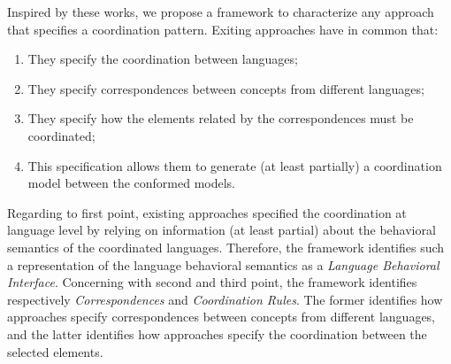 Inspired by these works, we propose a framework to characterize any approach that specifies a coordination pattern. Exiting approaches have in common that:
\begin{enumerate}
	\item They specify the coordination between languages;
	
	\item They specify correspondences between concepts from different languages;
	
	\item They specify how the elements related by the correspondences must be coordinated;
	
	\item This specification allows them to generate (at least partially) a coordination model between the conformed models.    
\end{enumerate}	
Regarding to first point, existing approaches specified the coordination at language level by relying on information (at least partial) about the behavioral semantics of the coordinated languages. Therefore, the framework identifies such a representation of the language behavioral semantics as a \emph{Language Behavioral Interface}. Concerning with second and third point, the framework identifies respectively \emph{Correspondences} and \emph{Coordination Rules}. The former identifies how approaches specify correspondences between concepts from different languages, and the latter identifies how approaches specify the coordination between the selected elements.

